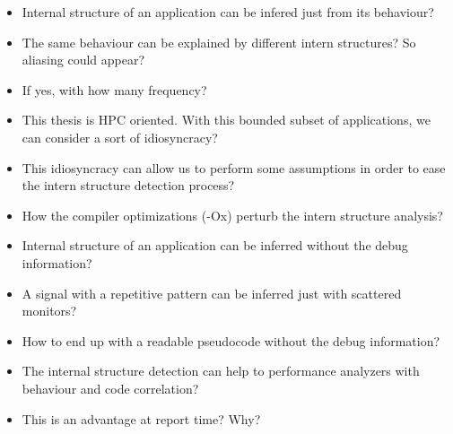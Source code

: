 \documentclass[draft]{article}
\begin{document}
\begin{itemize}
    \item Internal structure of an application can be infered just from its behaviour?
    \item The same behaviour can be explained by different intern structures? So aliasing could appear?
    \item If yes, with how many frequency?
    \item This thesis is HPC oriented. With this bounded subset of applications, we can consider a sort of idiosyncracy?
    \item This idiosyncracy can allow us to perform some assumptions in order to ease the intern structure detection process?
    \item How the compiler optimizations (-Ox) perturb the intern structure analysis?
    \item Internal structure of an application can be inferred without the debug information?
    \item A signal with a repetitive pattern can be inferred just with scattered monitors?
    \item How to end up with a readable pseudocode without the debug information?
    \item The internal structure detection can help to performance analyzers with behaviour and code correlation?
    \item This is an advantage at report time? Why?
\end{itemize}
\end{document}

